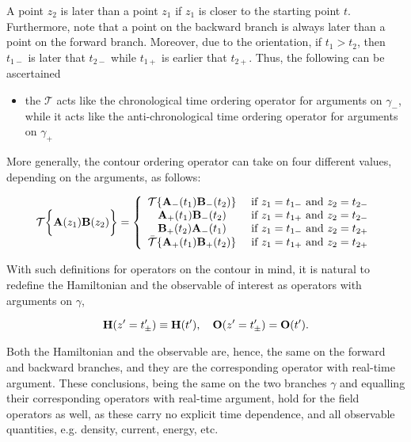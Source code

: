 A point $z_2$ is later than a point $z_1$ if $z_1$ is closer to the starting point $t$. 
Furthermore, note that a point on the backward branch is always later than a point on the forward branch.
Moreover, due to the orientation, if $t_1 > t_2$, then $t_{1-}$ is later that $t_{2-}$ while $t_{1+}$ is earlier that $t_{2+}$.
Thus, the following can be ascertained

\begin{itemize}
    \item the $\mathcal{T}$ acts like the chronological time ordering operator for arguments on $\gamma_{-}$,
    \time while it acts like the anti-chronological time ordering operator for arguments on $\gamma_+$
\end{itemize}

More generally, the contour ordering operator can take on four different values, depending on the arguments, as follows:

\begin{equation}
    \mathcal{T} \bigg\{
        {\bf A}(z_1) {\bf B}(z_2)
    \bigg\} = \left\{
        \begin{array}{cc}
             \mathcal{T} \{ {\bf A}_{-}(t_1) {\bf B}_{-}(t_2) \} & \textnormal{ if $z_1 = t_{1-}$ and $z_2 = t_{2-}$} \\
             {\bf A}_{+}(t_1) {\bf B}_{-}(t_2) & \textnormal{ if $z_1 = t_{1+}$ and $z_2 = t_{2-}$} \\
             {\bf B}_{+}(t_2) {\bf A}_{-}(t_1) & \textnormal{ if $z_1 = t_{1-}$ and $z_2 = t_{2+}$} \\
             \bar{\mathcal{T}} \{ {\bf A}_{+}(t_1) {\bf B}_{+}(t_2) \} & \textnormal{ if $z_1 = t_{1+}$ and $z_2 = t_{2+}$} 
        \end{array}
    \right.
\end{equation}

With such definitions for operators on the contour in mind, it is natural to redefine the Hamiltonian and the observable of interest as operators with arguments on $\gamma$, 

\begin{equation}
    {\bf H}(z' = t'_{\pm}) \equiv {\bf H}(t'), \quad {\bf O}(z' = t'_{\pm}) = {\bf O}(t').
\end{equation}

Both the Hamiltonian and the observable are, hence, the same on the forward and backward branches, and they are the corresponding operator with real-time argument. 
These conclusions, being the same on the two branches $\gamma$ and equalling their corresponding operators with real-time argument, hold for the field operators as well, as these carry no explicit time dependence, and all observable quantities, e.g. density, current, energy, etc. \smallbreak

